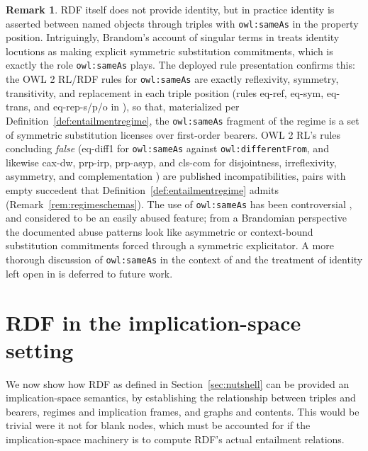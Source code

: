 \documentclass[12pt]{article}
\theoremstyle{definition}
\newtheorem{remark}{Remark}
\begin{document}
\begin{remark}
\label{rem:identity}
RDF itself does not provide identity, but in practice identity is asserted between named objects through triples with \texttt{owl:sameAs} in the property position. Intriguingly, Brandom's account of singular terms in \citet[Ch. 6]{brandom1994making} treats identity locutions as making explicit symmetric substitution commitments, which is exactly the role \texttt{owl:sameAs} plays. The deployed rule presentation confirms this: the OWL 2 RL/RDF rules for \texttt{owl:sameAs} are exactly reflexivity, symmetry, transitivity, and replacement in each triple position (rules eq-ref, eq-sym, eq-trans, and eq-rep-s/p/o in \citet{motik2012owl}), so that, materialized per Definition~\ref{def:entailmentregime}, the \texttt{owl:sameAs} fragment of the regime is a set of symmetric substitution licenses over first-order bearers. OWL 2 RL's rules concluding \emph{false} (eq-diff1 for \texttt{owl:sameAs} against \texttt{owl:differentFrom}, and likewise cax-dw, prp-irp, prp-asyp, and cls-com for disjointness, irreflexivity, asymmetry, and complementation \citep{motik2012owl}) are published incompatibilities, pairs with empty succedent that Definition~\ref{def:entailmentregime} admits (Remark~\ref{rem:regimeschemas}). The use of \texttt{owl:sameAs} has been controversial \citep{halpin2010sameas,beek2018sameas}, and considered to be an easily abused feature; from a Brandomian perspective the documented abuse patterns look like asymmetric or context-bound substitution commitments forced through a symmetric explicitator. A more thorough discussion of \texttt{owl:sameAs} in the context of \citet{brandom1994making} and the treatment of identity left open in \citet{hlobil2026objects} is deferred to future work.
\end{remark}

\section{RDF in the implication-space setting}
\label{sec:setting}

We now show how RDF as defined in Section~\ref{sec:nutshell} can be provided an implication-space semantics, by establishing the relationship between triples and bearers, regimes and implication frames, and graphs and contents. This would be trivial were it not for blank nodes, which must be accounted for if the implication-space machinery is to compute RDF's actual entailment relations.
\end{document}
